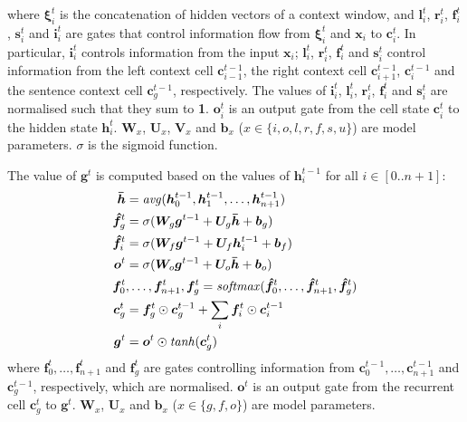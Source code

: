 \documentclass[11pt,a4paper]{article}
\begin{document}
where $\boldsymbol{\xi}_i^t$ is the concatenation of hidden vectors of a context window, and $\boldsymbol{l}_i^t$, $\boldsymbol{r}_i^t$, $\boldsymbol{f}_i^t$, $\boldsymbol{s}_i^t$ and $\boldsymbol{i}_i^t$ are gates that control information flow from $\boldsymbol{\xi}_i^t$ and $\boldsymbol{x}_i$ to $\boldsymbol{c}_i^t$.
In particular, $\boldsymbol{i}_i^t$ controls information from the input $\boldsymbol{x}_i$; $\boldsymbol{l}_i^t$, $\boldsymbol{r}_i^t$, $\boldsymbol{f}_i^t$ and $\boldsymbol{s}_i^t$ control information from the left context cell $\boldsymbol{c}_{i-1}^{t-1}$, the right context cell $\boldsymbol{c}_{i+1}^{t-1}$, $\boldsymbol{c}_{i}^{t-1}$ and the sentence context cell $\boldsymbol{c}_g^{t-1}$, respectively.
The values of $\boldsymbol{i}_i^t$, $\boldsymbol{l}_i^t$, $\boldsymbol{r}_i^t$, $\boldsymbol{f}_i^t$ and $\boldsymbol{s}_i^t$ are normalised such that they sum to {\bf 1}. 
$\boldsymbol{o}_i^t$ is an output gate from the cell state $\boldsymbol{c}_i^t$ to the hidden state $\boldsymbol{h}_i^t$.
$\boldsymbol{W}_x$, $\boldsymbol{U}_x$, $\boldsymbol{V}_x$ and $\boldsymbol{b}_x$ ($x \in \{i,o,l,r,f,s,u\}$) are model parameters. $\sigma$ is the sigmoid function.


The value of $\boldsymbol{g}^{t}$ is computed based on the values of $\boldsymbol{h}_i^{t-1}$ for all $i \in [0..n+1]$:
\begin{equation} \label{eq:mlstm_g}
\begin{aligned}
\boldsymbol{\bar{h}}&= {\it avg}(\boldsymbol{h}_0^{t-1}, \boldsymbol{h}_1^{t-1}, \dots, \boldsymbol{h}_{n+1}^{t-1})\\
\boldsymbol{\hat{f}}_g^{t} &= \sigma(\boldsymbol{W}_g \boldsymbol{g}^{t-1} + \boldsymbol{U}_g \boldsymbol{\bar{h}} + \boldsymbol{b}_g)\\
\boldsymbol{\hat{f}}_i^{t} &= \sigma(\boldsymbol{W}_f \boldsymbol{g}^{t-1} + \boldsymbol{U}_f \boldsymbol{h}_i^{t-1} + \boldsymbol{b}_f)\\
\boldsymbol{o}^{t} &= \sigma(\boldsymbol{W}_o \boldsymbol{g}^{t-1} + \boldsymbol{U}_o \boldsymbol{\bar{h}} + \boldsymbol{b}_o)\\
\boldsymbol{f}_0^t&, \dots, \boldsymbol{f}_{n+1}^t, \boldsymbol{f}_g^{t} = {\it softmax}(\boldsymbol{\hat{f}}_0^t, \dots, \boldsymbol{\hat{f}}_{n+1}^t, \boldsymbol{\hat{f}}_g^{t})\\
\boldsymbol{c}_g^{t} &= \boldsymbol{f}_g^{t} \odot \boldsymbol{c}_g^{t-1} + \sum_i \boldsymbol{f}_i^t \odot \boldsymbol{c}_i^{t-1}  \\
\boldsymbol{g}^t &= \boldsymbol{o}^{t} \odot {\it tanh}(\boldsymbol{c}_g^{t})\\
\end{aligned}
\end{equation}
where $\boldsymbol{f}_0^t, \dots, \boldsymbol{f}_{n+1}^t$ and $\boldsymbol{f}_g^{t}$ are gates controlling information from $\boldsymbol{c}_0^{t-1}, \dots, \boldsymbol{c}_{n+1}^{t-1}$ and $\boldsymbol{c}_g^{t-1}$, respectively, which are normalised. 
$\boldsymbol{o}^{t}$ is an output gate from the recurrent cell $\boldsymbol{c}_g^{t}$ to $\boldsymbol{g}^{t}$.
$\boldsymbol{W}_x$, $\boldsymbol{U}_x$ and $\boldsymbol{b}_x$ ($x \in \{g, f, o\}$) are model parameters.
\end{document}
